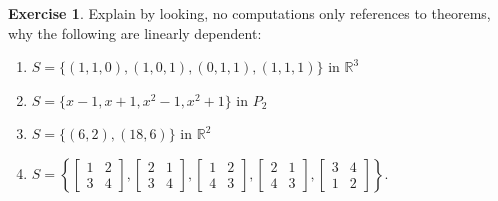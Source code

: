 \documentclass{beamer}
\newcommand{\R}{\mathbb{R}}
\newcommand{\fn}{\insertframenumber}
\theoremstyle{definition}
\newtheorem{exercise}{Exercise}
\begin{document}
\begin{frame}{\fn}
	\begin{exercise}
		Explain by looking, no computations only references to theorems, why the following are linearly dependent:
		\begin{enumerate}[label=(\alph*)]
			\item $S=\{(1,1,0),(1,0,1),(0,1,1),(1,1,1)\}$ in $\R^3$
			\item $S=\{x-1,x+1,x^2-1,x^2+1\}$ in $P_2$
			\item $S=\{(6,2),(18,6)\}$ in $\R^2$
			\item $S=\left\{\begin{bmatrix}1&2\\3&4\end{bmatrix},\begin{bmatrix}2&1\\3&4\end{bmatrix},\begin{bmatrix}1&2\\4&3\end{bmatrix},\begin{bmatrix}2&1\\4&3\end{bmatrix},\begin{bmatrix}3&4\\1&2\end{bmatrix}\right\}$.
		\end{enumerate}
	\end{exercise}
\end{frame}
\end{document}
